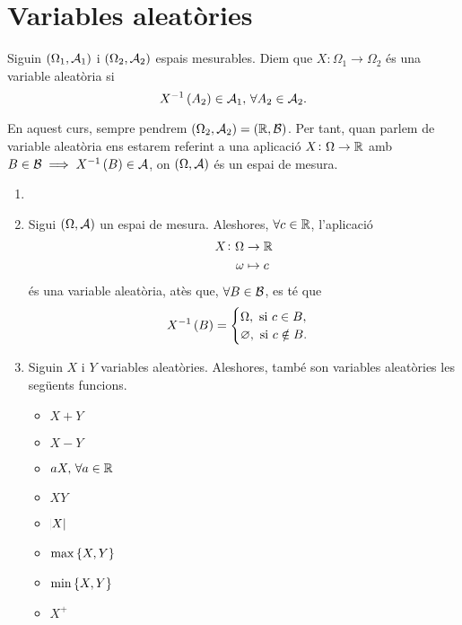 \chapter{Variables aleatòries}
\begin{defi}
    Siguin $\left( \Omega_1, \mathcal{A}_1\right)$ i $\left( \Omega_2, \mathcal{A}_2\right)$ espais mesurables. Diem que $X\colon \Omega_1\to\Omega_2$ és una variable aleatòria si
    \[
        X^{-1}\left( A_2\right)\in\mathcal{A}_1,\,\forall A_2\in\mathcal{A}_2.
    \]
\end{defi}
\noindent En aquest curs, sempre pendrem $\left( \Omega_2, \mathcal{A}_2\right)=\left( \mathbb{R},\mathcal{B}\right)$. Per tant, quan parlem de variable aleatòria ens estarem referint a una aplicació $X\colon\Omega\to\mathbb{R}$ amb $B\in\mathcal{B}\implies X^{-1}\left( B\right)\in\mathcal{A}$, on $\left( \Omega, \mathcal{A}\right)$ és un espai de mesura.
\begin{example}
    \begin{enumerate}[1.]
        \item[]
        \item Sigui $\left( \Omega, \mathcal{A}\right)$ un espai de mesura. Aleshores, $\forall c\in\mathbb{R}$, l'aplicació
            \begin{align*}
                X\colon \Omega &\to\mathbb{R}\\
                \omega &\mapsto c
            \end{align*}
            és una variable aleatòria, atès que, $\forall B\in\mathcal{B}$, es té que
            \[
                X^{-1}\left( B\right)=\begin{cases}
                    \Omega, \text{ si } c\in B,\\
                    \varnothing, \text{ si } c\notin B.
                \end{cases}
            \]
        \item Siguin $X$ i $Y$ variables aleatòries. Aleshores, també son variables aleatòries les següents funcions.
            \begin{itemize}
                \item $X+Y$
                \item $X-Y$
                \item $aX,\,\forall a\in\mathbb{R}$
                \item $XY$
                \item $\abs{X}$
                \item $\max\left\{ X, Y\right\}$
                \item $\min\left\{ X, Y\right\}$
                \item $X^+$

\end{itemize}
\end{enumerate}
\end{example}
